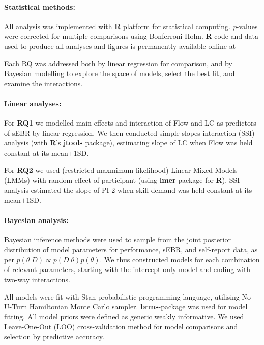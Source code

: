 \documentclass[10pt,letterpaper,floatsintext]{article}
\begin{document}
\paragraph{Statistical methods:}
All analysis was implemented with {\bf R} platform for statistical computing. {\it p}-values were corrected for multiple comparisons using Bonferroni-Holm. {\bf R} code and data used to produce all analyses and figures is permanently available online at 

Each RQ was addressed both by linear regression for comparison, and by Bayesian modelling to explore the space of models, select the best fit, and examine the interactions. 

\paragraph{Linear analyses:}
For {\bf RQ1} we modelled main effects and interaction of Flow and LC as predictors of sEBR by linear regression. We then conducted simple slopes interaction (SSI) analysis (with {\bf R}'s {\bf jtools} package), estimating slope of LC when Flow was held constant at its mean$\pm$1SD. 

For \textbf{RQ2} we used (restricted maxmimum likelihood) Linear Mixed Models (LMMs) with random effect of participant (using {\bf lmer} package for {\bf R}). SSI analysis estimated the slope of PI-2 when skill-demand was held constant at its mean$\pm$1SD.

\paragraph{Bayesian analysis:}
Bayesian inference methods were used to sample from the joint posterior distribution of model parameters for performance, sEBR, and self-report data, as per $p(\theta|D) \propto p(D|\theta)p(\theta)$. We thus constructed models for each combination of relevant parameters, starting with the intercept-only model and ending with two-way interactions.  


All models were fit with Stan probabilistic programming language, utilising No-U-Turn Hamiltonian Monte Carlo sampler. {\bf brms}-package was used for model fitting. All model priors were defined as generic weakly informative. We used Leave-One-Out (LOO) cross-validation method for model comparisons and selection by predictive accuracy.
\end{document}
